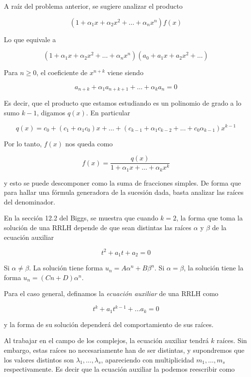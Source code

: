 A raíz del problema anterior, se sugiere analizar el producto

\[
(1 + \alpha_1 x + \alpha_2 x^2 + \dots + \alpha_n x^n)f(x)
\]

Lo que equivale a 

\[
(1 + \alpha_1 x + \alpha_2 x^2 + \dots + \alpha_n x^n)(a_0 + a_1x + a_2x^2 + \dots)
\]

Para $n \geq 0$, el coeficiente de $x^{n+k}$ viene siendo

\[
a_{n+k} + \alpha_1a_{n+k+1} + \dots + \alpha_ka_n = 0
\]

Es decir, que el producto que estamos estudiando es un polinomio de grado a lo sumo $k-1$, digamos $q(x)$. En particular

\[
q(x) = c_0 + (c_1 + \alpha_1c_0)x + \dots + (c_{k-1} + \alpha_1c_{k-2} + \dots + c_0\alpha_{k-1})x^{k-1}
\]

Por lo tanto, $f(x)$ nos queda como

\begin{equation}\label{eq:f(x)}
    f(x) = \frac{q(x)}{1 + \alpha_1x + \dots + \alpha_kx^k}
\end{equation}

\noindent y esto se puede descomponer como la suma de fracciones simples. De forma que para hallar una fórmula generadora de la sucesión dada, basta analizar las raíces del denominador.

En la sección 12.2 del Biggs, se muestra que cuando $k = 2$, la forma que toma la solución de una RRLH depende de que sean distintas las raíces $\alpha$ y $\beta$ de la ecuación auxiliar

\[
t^2 + a_1 t + a_2 = 0
\]

Si $\alpha \neq \beta$. La solución tiene forma $u_n = A\alpha^n + B\beta^n$. Si $\alpha = \beta$, la solución tiene la forma $u_n = (Cn + D)\alpha^n$.

Para el caso general, definamos la \textit{ecuación auxiliar} de una RRLH como

\[
t^k + a_1 t^{k-1} + \dots a_k = 0
\]

\noindent y la forma de su solución dependerá del comportamiento de sus raíces.

Al trabajar en el campo de los complejos, la ecuación auxiliar tendrá $k$ raíces. Sin embargo, estas raíces no necesariamente han de ser distintas, y supondremos que los valores distintos son $\lambda_1, \dots, \lambda_s$, apareciendo con multiplicidad $m_1, \dots, m_s$ respectivamente. Es decir que la ecuación auxiliar la podemos reescribir como

